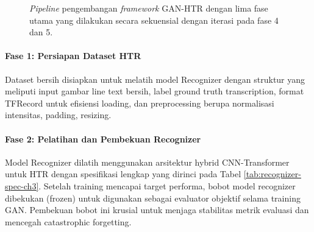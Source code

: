 \documentclass[12pt,a4paper]{article}
\begin{document}
\begin{figure}[H]
\caption{\textit{Pipeline} pengembangan \textit{framework} GAN-HTR dengan lima fase utama yang dilakukan secara sekuensial dengan iterasi pada fase 4 dan 5.}
\label{fig:development-pipeline}
\end{figure}

\paragraph{Fase 1: Persiapan Dataset HTR}
Dataset bersih disiapkan untuk melatih model Recognizer dengan struktur yang meliputi input gambar line text bersih, label ground truth transcription, format TFRecord untuk efisiensi loading, dan preprocessing berupa normalisasi intensitas, padding, resizing.

\paragraph{Fase 2: Pelatihan dan Pembekuan Recognizer}
Model Recognizer dilatih menggunakan arsitektur hybrid CNN-Transformer untuk HTR dengan spesifikasi lengkap yang dirinci pada Tabel \ref{tab:recognizer-spec-ch3}. Setelah training mencapai target performa, bobot model recognizer dibekukan (frozen) untuk digunakan sebagai evaluator objektif selama training GAN. Pembekuan bobot ini krusial untuk menjaga stabilitas metrik evaluasi dan mencegah catastrophic forgetting.
\end{document}
